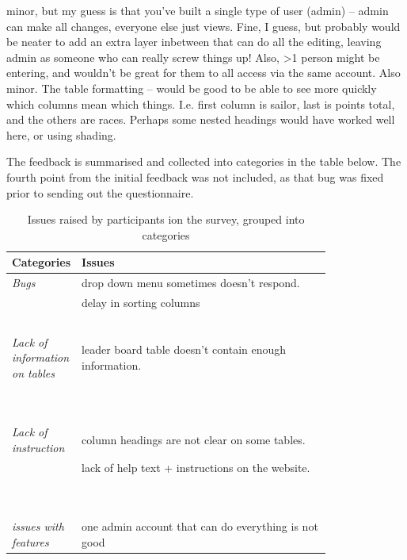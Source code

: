 \documentclass{l4proj}
\begin{document}
\begin{displayquote}
\begin{outline}
        \1 
        minor, but my guess is that you've built a single type of user (admin) -- admin can make all changes, everyone else just views. Fine, I guess, but probably would be neater to add an extra layer inbetween that can do all the editing, leaving admin as someone who can really screw things up! Also, >1 person might be entering, and wouldn't be great for them to all access via the same account.
        \1 
        Also minor. The table formatting -- would be good to be able to see more quickly which columns mean which things. I.e. first column is sailor, last is points total, and the others are races. Perhaps some nested headings would have worked well here, or using shading.
    \end{outline}
\end{displayquote}

The feedback is summarised and collected into categories in the table below. The fourth point from the initial feedback was not included, as that bug was fixed prior to sending out the questionnaire.     

\begin{table}[H]
    \centering
    \caption{Issues raised by participants ion the survey, grouped into categories}
    \begin{tabular}{|l|p{0.8\linewidth}|}
    \hline
        \textbf{Categories} & \textbf{Issues}  \\ \hline
        \textit{Bugs} & drop down menu sometimes doesn't respond.   \\ \hline
        ~ & delay in sorting columns \\ \hline
        ~ & ~ \\ \hline
        \textit{Lack of information on tables} & leader board table doesn't contain enough information.   \\ \hline
        ~ & \\ ~ \\ \hline
        \textit{Lack of instruction} & column headings are not clear on some tables.  \\ \hline
        ~ & lack of help text + instructions on the website. \\ \hline
        ~ & \\ ~ \\ \hline
        \textit{issues with features} & one admin account that can do everything is not good \\ \hline
    \end{tabular}
    \label{tab:table client feedback}
\end{table}
\end{document}
